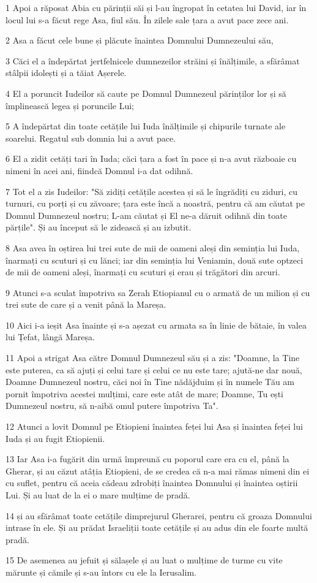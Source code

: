 \par 1 Apoi a răposat Abia cu părinții săi și l-au îngropat în cetatea lui David, iar în locul lui s-a făcut rege Asa, fiul său. În zilele sale țara a avut pace zece ani.
\par 2 Asa a făcut cele bune și plăcute înaintea Domnului Dumnezeului său,
\par 3 Căci el a îndepărtat jertfelnicele dumnezeilor străini și înălțimile, a sfărâmat stâlpii idolești și a tăiat Așerele.
\par 4 El a poruncit Iudeilor să caute pe Domnul Dumnezeul părinților lor și să împlinească legea și poruncile Lui;
\par 5 A îndepărtat din toate cetățile lui Iuda înălțimile și chipurile turnate ale soarelui. Regatul sub domnia lui a avut pace.
\par 6 El a zidit cetăți tari în Iuda; căci țara a fost în pace și n-a avut războaie cu nimeni în acei ani, fiindcă Domnul i-a dat odihnă.
\par 7 Tot el a zis Iudeilor: "Să zidiți cetățile acestea și să le îngrădiți cu ziduri, cu turnuri, cu porți și cu zăvoare; țara este încă a noastră, pentru că am căutat pe Domnul Dumnezeul nostru; L-am căutat și El ne-a dăruit odihnă din toate părțile". Și au început să le zidească și au izbutit.
\par 8 Asa avea în oștirea lui trei sute de mii de oameni aleși din seminția lui Iuda, înarmați cu scuturi și cu lănci; iar din seminția lui Veniamin, două sute optzeci de mii de oameni aleși, înarmați cu scuturi și erau și trăgători din arcuri.
\par 9 Atunci s-a sculat împotriva sa Zerah Etiopianul cu o armată de un milion și cu trei sute de care și a venit până la Mareșa.
\par 10 Aici i-a ieșit Asa înainte și s-a așezat cu armata sa în linie de bătaie, în valea lui Țefat, lângă Mareșa.
\par 11 Apoi a strigat Asa către Domnul Dumnezeul său și a zis: "Doamne, la Tine este puterea, ca să ajuți și celui tare și celui ce nu este tare; ajută-ne dar nouă, Doamne Dumnezeul nostru, căci noi în Tine nădăjduim și în numele Tău am pornit împotriva acestei mulțimi, care este atât de mare; Doamne, Tu ești Dumnezeul nostru, să n-aibă omul putere împotriva Ta".
\par 12 Atunci a lovit Domnul pe Etiopieni înaintea feței lui Asa și înaintea feței lui Iuda și au fugit Etiopienii.
\par 13 Iar Asa i-a fugărit din urmă împreună cu poporul care era cu el, până la Gherar, și au căzut atâția Etiopieni, de se credea că n-a mai rămas nimeni din ei cu suflet, pentru că aceia cădeau zdrobiți înaintea Domnului și înaintea oștirii Lui. Și au luat de la ei o mare mulțime de pradă.
\par 14 și au sfărâmat toate cetățile dimprejurul Gherarei, pentru că groaza Domnului intrase în ele. Și au prădat Israeliții toate cetățile și au adus din ele foarte multă pradă.
\par 15 De asemenea au jefuit și sălașele și au luat o mulțime de turme cu vite mărunte și cămile și s-au întors cu ele la Ierusalim.

